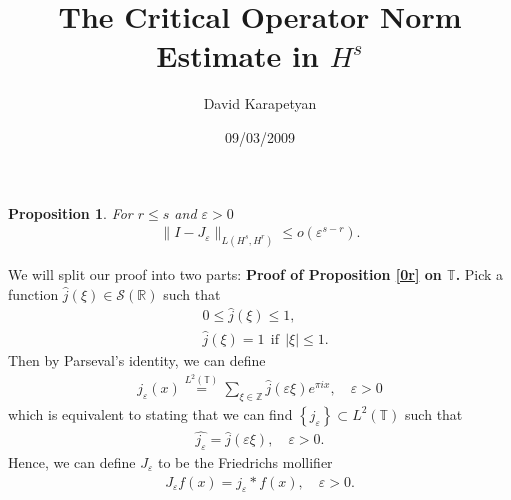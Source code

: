 \documentclass[12pt,reqno]{amsart}
\newcommand{\rr}{\mathbb{R}}
\newcommand{\zz}{\mathbb{Z}}
\newcommand{\ci}{\mathbb{T}}
\newcommand{\ee}{\varepsilon}
\theoremstyle{plain}  %
\newtheorem{proposition}{Proposition}
\theoremstyle{definition}
\begin{document}
\title{ The Critical Operator Norm Estimate in $H^s$}
\author{David Karapetyan}
\address{Department of Mathematics  \\
         University  of Notre Dame\\
		          Notre Dame, IN 46556 }
				  \date{09/03/2009}
				  \maketitle
				  \parindent0in
				  \parskip0.1in
				  \setcounter{equation}{0}
				 \begin{proposition}
	\label{lem4r}
	For $r \le s$ and $\ee>0$
	\begin{equation}
	\label{0r}
		\begin{split}
			\|I - J_\ee\|_{L(H^s, H^r)} \le o(\ee^{s-r}).
		\end{split}
	\end{equation}
\end{proposition}
%
\vskip0.1in
We will split our proof into two parts:
\vskip0.1in
{\bf Proof of Proposition \ref{0r} on $\ci$.}
Pick a function $\widehat{j}(\xi) \in \mathcal{S}(\rr)$ such that
	\begin{equation}
		\label{0u}
		\begin{split}
			& 0 \le \widehat{j}(\xi) \le 1,
			\\
			& \widehat{j}(\xi) = 1 \ \ \text{if} \ \ |\xi| \le 1.
		\end{split}
	\end{equation}
	Then by Parseval's identity, we can define
	\begin{equation}
		\begin{split}
			j_\ee (x) \overset{L^2(\ci)}{=} \sum_{\xi \in \zz}
			\widehat{j}(\ee \xi) e^{\pi i x}, \quad \ee > 0
			\label{parseval-def}
		\end{split}
	\end{equation}
	which is equivalent to stating that we can find $\left\{ j_\ee
	\right\} \subset L^2(\ci)$ such that
	\begin{equation}
		\begin{split}
			\widehat{j_\ee} = \widehat{j }(\ee \xi), \quad \ee > 0.
			\label{widehat-def}
		\end{split}
	\end{equation}
	Hence, we can define $J_\ee$ to be the Friedrichs mollifier 
	\begin{equation}
		\label{0'u}
		\begin{split}
			J_\ee f(x) = j_\ee * f(x), \quad \ee>0.
		\end{split}
	\end{equation}
\end{document}
